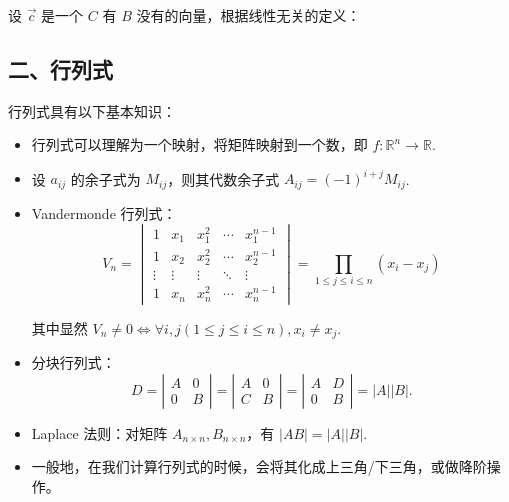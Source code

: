 \documentclass[b5paper]{ctexart}
\newcommand{\R}{\mathbb{R}}
\begin{document}
	设 $\vec{c}$ 是一个 $C$ 有 $B$ 没有的向量，根据线性无关的定义：
	
	
	
	\subsection*{二、行列式}
	
	行列式具有以下基本知识：
	\begin{itemize}
		\item 行列式可以理解为一个映射，将矩阵映射到一个数，即 $f: \R^n \to \R$.
		
		\item 设 $a_{ij}$ 的余子式为 $M_{ij}$，则其代数余子式 $A_{ij} = (-1)^{i + j} M_{ij}$.
		
		\item Vandermonde 行列式：
		\[ V_n = 
		\begin{vmatrix}
			1 & x_1 & x_1^2 & \cdots & x_1^{n-1} \\
			1 & x_2 & x_2^2 & \cdots & x_2^{n-1} \\
			\vdots & \vdots & \vdots & \ddots & \vdots \\
			1 & x_n & x_n^2 & \cdots & x_n^{n-1}
		\end{vmatrix}
		 = \prod \limits_{1 \le j \le i \le n} (x_i - x_j)
		\] 
		
		其中显然 $V_n \ne 0 \iff \forall i, j(1 \le j \le i \le n), x_i \ne x_j$.
		
		\item 分块行列式：
		$$
		D = \left | \begin{matrix}
			A & 0 \\
			0 & B 
		\end{matrix} \right | =  \left |
		 \begin{matrix}
			A & 0 \\
			C & B 
		\end{matrix} \right | = \left |
		\begin{matrix}
			A & D \\
			0 & B 
		\end{matrix} \right | = 
		|A||B|.
		$$
		
		\item Laplace 法则：对矩阵 $A_{n \times n}, B_{n \times n}$，有 $|AB| = |A||B|$.
		
		\item 一般地，在我们计算行列式的时候，会将其化成上三角/下三角，或做降阶操作。
	\end{itemize}
	
	
	
\end{document}
